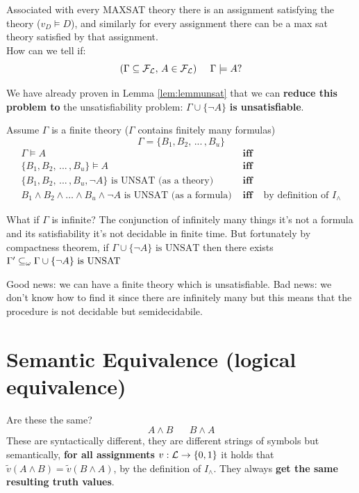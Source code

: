 	\noindent
	Associated with every MAXSAT theory there is an assignment satisfying the theory ($v_D \models D$), and similarly for every assignment there can be a max sat theory satisfied by that assignment.\\

	\noindent
	How can we tell if:
	$$(\Gamma \subseteq \mathcal{F}_\mathcal{L}, \, A \in \mathcal{F}_\mathcal{L}) \;\;\;\;\; \Gamma \models A ?$$

	\noindent
	We have already proven in Lemma \ref{lem:lemmunsat} that we can \textbf{reduce this problem to} the unsatisfiability problem: $\Gamma \cup \{\neg A\}$ \textbf{is unsatisfiable}.

	\noindent
	Assume $\Gamma$ is a finite theory ($\Gamma$ contains finitely many formulas)
	$$\Gamma = \{B_1, B_2, \, ... \, , B_u \}$$ \vspace{-0.6cm}
	\begin{align*}
	\Gamma \models A &\textbf{ iff } & \\
	\{B_1, B_2, \, ... \, , B_u \} \models A &\textbf{ iff } & \\
	\{B_1, B_2, \, ... \, , B_u, \neg A \} \text{ is UNSAT (as a theory)} &\textbf{ iff } & \\
	B_1 \wedge B_2 \wedge \ldots \wedge  B_u \wedge \neg A \text{ is UNSAT (as a formula)} &\textbf{ iff } & \text{by definition of } I_\wedge
	\end{align*}

	\noindent
	What if $\Gamma$ is infinite? The conjunction of infinitely many things it's not a formula and its satisfiability it's not decidable in finite time.  But fortunately by compactness theorem, if $\Gamma  \cup \{\neg A\} \text{ is UNSAT}$ then there exists $ \Gamma' \subseteq_\omega \Gamma \cup \{\neg A\} \text{ is UNSAT} $

Good news: we can have a finite theory which is unsatisfiable. Bad news: we don't know how to find it since there are infinitely many but this means that the procedure is not decidable but semidecidabile.

	\newpage

	\section{Semantic Equivalence (logical equivalence)}

	Are these the same?
	$$ A \wedge B \;\;\;\;\;\; B \wedge A $$
	These are syntactically different, they are different strings of symbols but semantically, \textbf{for all assignments} $v: \mathcal{L} \rightarrow \{0,1\}$ it holds that $\tilde{v} (A \wedge B) = \tilde{v} (B \wedge A)$, by the definition of $I_\wedge$. They always \textbf{get the same resulting truth values}.\\

